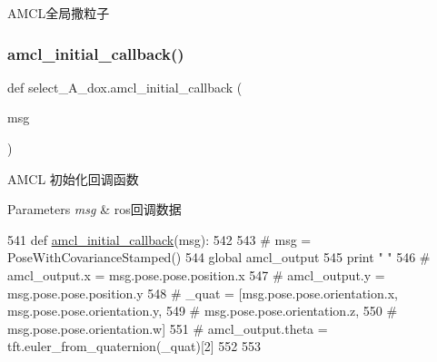 A\+M\+C\+L全局撒粒子 


\mbox{\label{namespaceselect___a__dox_a843ff715ed42a01fc98f2199ea314cea}} 
\subsubsection{\texorpdfstring{amcl\+\_\+initial\+\_\+callback()}{amcl\_initial\_callback()}}
{\footnotesize\ttfamily def select\+\_\+\+A\+\_\+dox.\+amcl\+\_\+initial\+\_\+callback (\begin{DoxyParamCaption}\item[{}]{msg }\end{DoxyParamCaption})}



A\+M\+CL 初始化回调函数 


\begin{DoxyParams}{Parameters}
{\em msg} & ros回调数据 \\
\hline
\end{DoxyParams}

\begin{DoxyCode}
541 \textcolor{keyword}{def }\hyperlink{namespaceselect___a__dox_a843ff715ed42a01fc98f2199ea314cea}{amcl\_initial\_callback}(msg):
542 
543     \textcolor{comment}{# msg = PoseWithCovarianceStamped()}
544     \textcolor{keyword}{global} amcl\_output
545     \textcolor{keywordflow}{print} \textcolor{stringliteral}{"  "}
546     \textcolor{comment}{# amcl\_output.x = msg.pose.pose.position.x}
547     \textcolor{comment}{# amcl\_output.y = msg.pose.pose.position.y}
548     \textcolor{comment}{# \_quat = [msg.pose.pose.orientation.x, msg.pose.pose.orientation.y,}
549     \textcolor{comment}{#          msg.pose.pose.orientation.z,}
550     \textcolor{comment}{#          msg.pose.pose.orientation.w]}
551     \textcolor{comment}{# amcl\_output.theta = tft.euler\_from\_quaternion(\_quat)[2]}
552 
553 
\end{DoxyCode}
\mbox{\label{namespaceselect___a__dox_aaae6f4a3d568931c6038b1e3cbfb6f9a}} 
